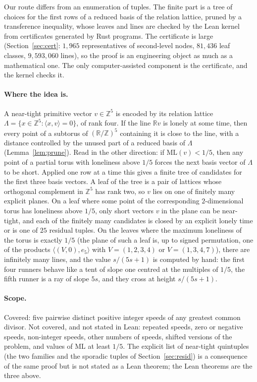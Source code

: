 \documentclass[11pt]{article}
\theoremstyle{remark}
\newcommand{\ML}{\mathrm{ML}}
\newcommand{\R}{\mathbb{R}}
\newcommand{\Z}{\mathbb{Z}}
\begin{document}
Our route differs from an enumeration of tuples. The finite part is a tree of choices for the first rows of a reduced basis of the relation lattice, pruned by a transference inequality, whose leaves and lines are checked by the Lean kernel from certificates generated by Rust programs. The certificate is large (Section~\ref{sec:cert}: $1{,}965$ representatives of second-level nodes, $81{,}436$ leaf classes, $9{,}593{,}060$ lines), so the proof is an engineering object as much as a mathematical one. The only computer-assisted component is the certificate, and the kernel checks it.

\paragraph{Where the idea is.} A near-tight primitive vector $v\in\Z^5$ is encoded by its relation lattice $\Lambda=\{x\in\Z^5:\langle x,v\rangle=0\}$, of rank four. If the line $\R v$ is lonely at some time, then every point of a subtorus of $(\R/\Z)^5$ containing it is close to the line, with a distance controlled by the unused part of a reduced basis of $\Lambda$ (Lemma~\ref{lem:prune}). Read in the other direction: if $\ML(v)<1/5$, then any point of a partial torus with loneliness above $1/5$ forces the next basis vector of $\Lambda$ to be short. Applied one row at a time this gives a finite tree of candidates for the first three basis vectors. A leaf of the tree is a pair of lattices whose orthogonal complement in $\Z^5$ has rank two, so $v$ lies on one of finitely many explicit planes. On a leaf where some point of the corresponding $2$-dimensional torus has loneliness above $1/5$, only short vectors $v$ in the plane can be near-tight, and each of the finitely many candidates is closed by an explicit lonely time or is one of $25$ residual tuples. On the leaves where the maximum loneliness of the torus is exactly $1/5$ (the plane of such a leaf is, up to signed permutation, one of the products $\langle(V,0),e_5\rangle$ with $V=(1,2,3,4)$ or $V=(1,3,4,7)$), there are infinitely many lines, and the value $s/(5s+1)$ is computed by hand: the first four runners behave like a tent of slope one centred at the multiples of $1/5$, the fifth runner is a ray of slope $5s$, and they cross at height $s/(5s+1)$.

\paragraph{Scope.} Covered: five pairwise distinct positive integer speeds of any greatest common divisor. Not covered, and not stated in Lean: repeated speeds, zero or negative speeds, non-integer speeds, other numbers of speeds, shifted versions of the problem, and values of $\ML$ at least $1/5$. The explicit list of near-tight quintuples (the two families and the sporadic tuples of Section~\ref{sec:resid}) is a consequence of the same proof but is not stated as a Lean theorem; the Lean theorems are the three above.
\end{document}

